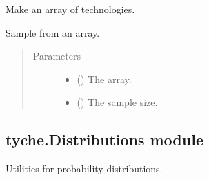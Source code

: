 \documentclass[letterpaper,10pt,english]{sphinxmanual}
\begin{document}
\begin{fulllineitems}
\begin{fulllineitems}
\end{fulllineitems}


\begin{fulllineitems}
\label{\detokenize{doc-src/tyche:tyche.Designs.Designs.vectorize_technologies}}
Make an array of technologies.

\end{fulllineitems}


\end{fulllineitems}


\begin{fulllineitems}
\label{\detokenize{doc-src/tyche:tyche.Designs.sampler}}
Sample from an array.
\begin{quote}\begin{description}
\item[{Parameters}] \leavevmode\begin{itemize}
\item {} 
 () \textendash{} The array.

\item {} 
 () \textendash{} The sample size.

\end{itemize}

\end{description}\end{quote}

\end{fulllineitems}



\subsection{tyche.Distributions module}
\label{\detokenize{doc-src/tyche:module-tyche.Distributions}}\label{\detokenize{doc-src/tyche:tyche-distributions-module}}
Utilities for probability distributions.
\end{document}
